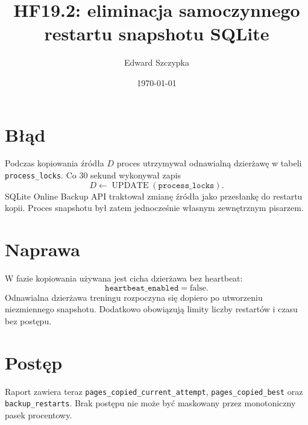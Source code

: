 \documentclass[11pt,a4paper]{article}
\title{HF19.2: eliminacja samoczynnego restartu snapshotu SQLite}
\author{Edward Szczypka}
\date{\today}
\begin{document}
\maketitle
\section{Błąd}
Podczas kopiowania źródła $D$ proces utrzymywał odnawialną dzierżawę w tabeli
\texttt{process\_locks}. Co $30$ sekund wykonywał zapis
\[
  D \leftarrow \operatorname{UPDATE}(\texttt{process\_locks}).
\]
SQLite Online Backup API traktował zmianę źródła jako przesłankę do restartu
kopii. Proces snapshotu był zatem jednocześnie własnym zewnętrznym pisarzem.
\section{Naprawa}
W fazie kopiowania używana jest cicha dzierżawa bez heartbeat:
\[
  \texttt{heartbeat\_enabled}=\mathrm{false}.
\]
Odnawialna dzierżawa treningu rozpoczyna się dopiero po utworzeniu niezmiennego
snapshotu. Dodatkowo obowiązują limity liczby restartów i czasu bez postępu.
\section{Postęp}
Raport zawiera teraz
\texttt{pages\_copied\_current\_attempt},
\texttt{pages\_copied\_best} oraz
\texttt{backup\_restarts}. Brak postępu nie może być maskowany przez
monotoniczny pasek procentowy.
\end{document}
